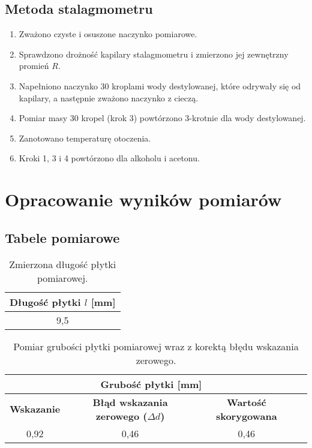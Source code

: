 \documentclass[a4paper,12pt]{article}
\begin{document}
\subsection{Metoda stalagmometru}
\begin{enumerate}
    \item Zważono czyste i osuszone naczynko pomiarowe.
    \item Sprawdzono drożność kapilary stalagmometru i zmierzono jej zewnętrzny promień $R$.
    \item Napełniono naczynko 30 kroplami wody destylowanej, które odrywały się od kapilary, a następnie zważono naczynko z cieczą.
    \item Pomiar masy 30 kropel (krok 3) powtórzono 3-krotnie dla wody destylowanej.
    \item Zanotowano temperaturę otoczenia.
    \item Kroki 1, 3 i 4 powtórzono dla alkoholu i acetonu.
\end{enumerate}

\section{Opracowanie wyników pomiarów}

\subsection{Tabele pomiarowe}


\begin{table}[H]
    \centering
    \begin{tabular}{|c|}
        \hline
        \textbf{Długość płytki $l$ [mm]} \\
        \hline
        9{,}5 \\ %
        \hline
    \end{tabular}
    \caption{Zmierzona długość płytki pomiarowej.}
    \label{tab:dlugosc_plytki}
\end{table}

\begin{table}[H]
    \centering
    \begin{tabular}{|c|c|c|c|}
        \hline

        \multicolumn{3}{|c|}{\textbf{Grubość płytki [mm]}} \\
        \hline
        \textbf{Wskazanie} & \textbf{Błąd wskazania zerowego ($\Delta d$) } & \textbf{Wartość skorygowana} \\
        \hline
        0{,}92 & 0{,}46 & 0{,}46 \\
        \hline
    \end{tabular}
    \caption{Pomiar grubości płytki pomiarowej wraz z korektą błędu wskazania zerowego.}
    \label{tab:grubosc_plytki}
\end{table}
\end{document}
